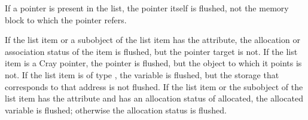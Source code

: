 \begin{ccppspecific}
If a pointer is present in the list, the pointer itself is flushed, not the 
memory block to which the pointer refers.
\end{ccppspecific}

\begin{fortranspecific}
If the list item or a subobject of the list item has the  attribute, 
the allocation or association status of the  item is flushed, but 
the pointer target is not. If the list item is a Cray pointer, the pointer is 
flushed, but the object to which it points is not. If the list item is of type 
, the variable is flushed, but the storage that corresponds to that 
address is not flushed. If the list item or the subobject of the list item has the
 attribute and has an allocation status of allocated, the
allocated variable is flushed; otherwise the allocation status is flushed.
\end{fortranspecific}

